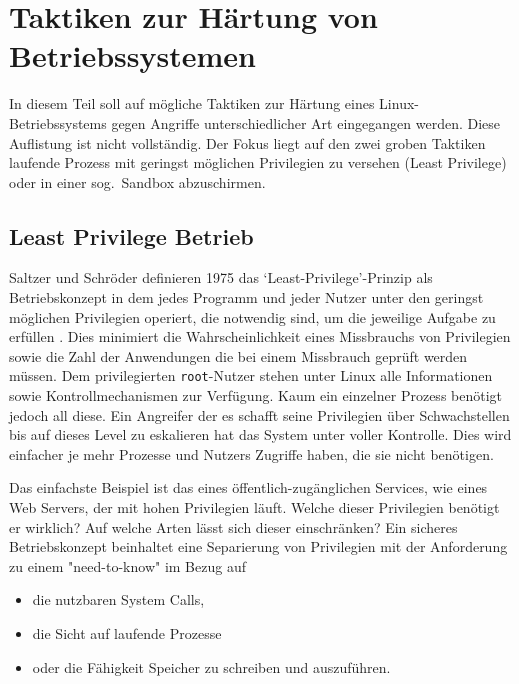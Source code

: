 
\chapter{Taktiken zur Härtung von Betriebssystemen}


In diesem Teil soll auf mögliche Taktiken zur Härtung eines Linux-Betriebssystems gegen Angriffe unterschiedlicher Art eingegangen werden. Diese Auflistung ist nicht vollständig. Der Fokus liegt auf den zwei groben Taktiken laufende Prozess mit geringst möglichen Privilegien zu versehen (\gls{Least Privilege}) oder in einer sog.\ \gls{Sandbox} abzuschirmen.

\section{Least Privilege Betrieb}

Saltzer und Schröder definieren 1975 das `Least-Privilege'-Prinzip als Betriebskonzept in dem jedes Programm und jeder Nutzer unter den geringst möglichen Privilegien operiert, die notwendig sind, um die jeweilige Aufgabe zu erfüllen \cite{saltzer_1975}. Dies minimiert die Wahrscheinlichkeit eines Missbrauchs von Privilegien sowie die Zahl der Anwendungen die bei einem Missbrauch geprüft werden müssen. 
Dem privilegierten \texttt{root}-Nutzer stehen unter Linux alle Informationen sowie Kontrollmechanismen zur Verfügung. Kaum ein einzelner Prozess benötigt jedoch all diese. Ein Angreifer der es schafft seine Privilegien über Schwachstellen bis auf dieses Level zu eskalieren hat das System unter voller Kontrolle. Dies wird einfacher je mehr Prozesse und Nutzers Zugriffe haben, die sie nicht benötigen.

Das einfachste Beispiel ist das eines öffentlich-zugänglichen Services, wie eines Web Servers, der mit hohen Privilegien läuft. Welche dieser Privilegien benötigt er wirklich? Auf welche Arten lässt sich dieser einschränken?
Ein sicheres Betriebskonzept beinhaltet eine Separierung von Privilegien mit der Anforderung zu einem "need-to-know" im Bezug auf 
\begin{itemize}
  \item die nutzbaren System Calls,
  \item die Sicht auf laufende Prozesse
  \item oder die Fähigkeit Speicher zu schreiben und auszuführen.
\end{itemize}


